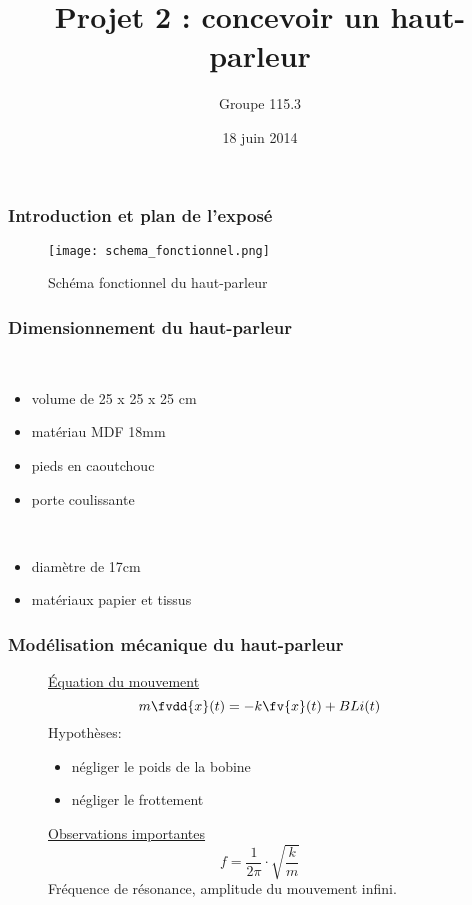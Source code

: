 \documentclass[pdf]{beamer}
\title{Projet 2 : concevoir un haut-parleur}
\author{Groupe 115.3}
\date{18 juin 2014}
\begin{document}
\begin{frame}
\titlepage
\end{frame}



\begin{frame}
\frametitle{Introduction et plan de l'exposé}
\begin{figure}[ht!]
    \centering
    \texttt{[image: schema\_fonctionnel.png]}
    \caption{Schéma fonctionnel du haut-parleur}
    \label{schema_fonctionnel}
\end{figure}
\end{frame}


\begin{frame}
\frametitle{Dimensionnement du haut-parleur}
 \\
\begin{itemize}
\item volume de 25 x 25 x 25 cm
\item matériau MDF 18mm
\item pieds en caoutchouc
\item porte coulissante
\end{itemize}
 \\
\begin{itemize}
\item diamètre de 17cm
\item matériaux papier et tissus
\end{itemize}
\end{frame}


\begin{frame}
\frametitle{Modélisation mécanique du haut-parleur}
\begin{figure}[ht]
\underline{Équation du mouvement}
$$m\fvdd{x}(t) = -k\fv{x}(t) + BLi(t)$$
Hypothèses: 
\begin{itemize}
\item négliger le poids de la bobine
\item négliger le frottement
\end{itemize}
\endminipage\hfill
{}
\underline{Observations importantes}
$$f= \frac{1}{2\pi} \cdot{\sqrt{\frac{k}{m}}}$$
Fréquence de résonance, amplitude du mouvement infini.
\endminipage\hfill
\end{figure}
\end{frame}
\end{document}
